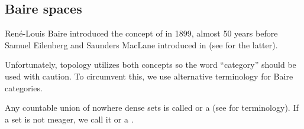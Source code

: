 \subsection{Baire spaces}\label{subsec:baire_spaces}

\begin{remark}\label{remark:baire_categories}
  René-Louis Baire introduced the concept of  in 1899, almost 50 years before Samuel Eilenberg and Saunders MacLane introduced  in \cite{MacLane1945} (see  for the latter).

  Unfortunately, topology utilizes both concepts so the word \enquote{category} should be used with caution. To circumvent this, we use alternative terminology for Baire categories.
\end{remark}

\begin{definition}\label{def:meager_set}\cite[definition 2.1]{Rudin1991}
  Any countable union of nowhere dense sets is called  or a  (see  for terminology). If a set is not meager, we call it  or a .
\end{definition}

